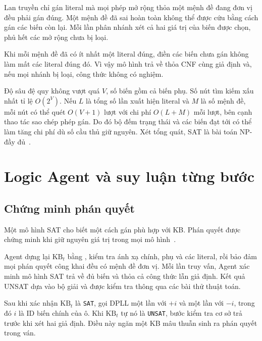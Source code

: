 \documentclass[11pt,a4paper]{article}
\newcommand{\code}[1]{\texttt{\detokenize{#1}}}
\newcommand{\SAT}{\texttt{SAT}}
\newcommand{\UNSAT}{\texttt{UNSAT}}
\newcommand{\KB}{\mathrm{KB}}
\begin{document}
Lan truyền chỉ gán literal mà mọi phép mở rộng thỏa một mệnh đề
đang đơn vị đều phải gán đúng. Một mệnh đề đã sai hoàn toàn
không thể được cứu bằng cách gán các biến còn lại.
Mỗi lần phân nhánh xét cả hai giá trị của biến được chọn,
phủ hết các mở rộng chưa bị loại.

Khi mỗi mệnh đề đã có ít nhất một literal đúng, điền các biến
chưa gán không làm mất các literal đúng đó.
Vì vậy mô hình trả về thỏa CNF cùng giả định và, nếu mọi nhánh
bị loại, công thức không có nghiệm.

Độ sâu đệ quy không vượt quá $V$, số biến gồm cả biến phụ.
Số nút tìm kiếm xấu nhất tỉ lệ $O(2^V)$.
Nếu $L$ là tổng số lần xuất hiện literal và $M$ là số mệnh đề,
mỗi nút có thể quét $O(V+1)$ lượt với chi phí $O(L+M)$ mỗi lượt,
bên cạnh thao tác sao chép phép gán.
Do đó bộ đếm trạng thái và các biến đạt tới có thể làm tăng
chi phí dù số cầu thủ giữ nguyên.
Xét tổng quát, SAT là bài toán NP-đầy đủ~\cite{cook}.

\clearpage

\section{Logic Agent và suy luận từng bước}

\subsection{Chứng minh phán quyết}

Một mô hình SAT cho biết một cách gán phù hợp với KB.
Phán quyết được chứng minh khi giữ nguyên giá trị trong mọi
mô hình~\cite{aima}.

Agent dựng lại $\KB_t$ bằng \code{build_kb}, kiểm tra ánh xạ chính,
phụ và các literal, rồi bảo đảm mọi phán quyết công khai đều có
mệnh đề đơn vị. Mỗi lần truy vấn, Agent xác minh mô hình SAT
trả về đủ biến và thỏa cả công thức lẫn giả định.
Kết quả UNSAT dựa vào bộ giải và được kiểm tra thông qua
các bài thử thuật toán.

Sau khi xác nhận $\KB_t$ là \SAT, \code{_classify} gọi DPLL một
lần với $+i$ và một lần với $-i$, trong đó $i$ là ID biến chính
của ô. Khi $\KB_t$ tự nó là \UNSAT, bước kiểm tra cơ sở trả
\code{INCONSISTENT} trước khi xét hai giả định.
Điều này ngăn một KB mâu thuẫn sinh ra phán quyết trong ván.
\end{document}
